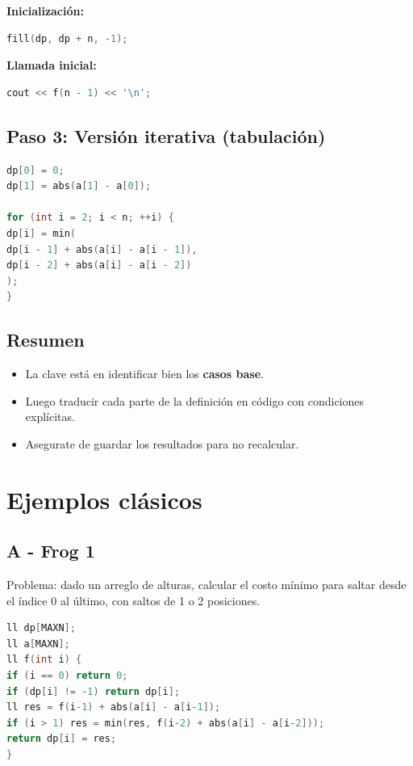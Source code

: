 \textbf{Inicialización:}

\begin{lstlisting}[language=C++]
fill(dp, dp + n, -1);
\end{lstlisting}

\textbf{Llamada inicial:}

\begin{lstlisting}[language=C++]
cout << f(n - 1) << '\n';
\end{lstlisting}

\subsection*{Paso 3: Versión iterativa (tabulación)}

\begin{lstlisting}[language=C++, caption=Versión iterativa (bottom-up)]
dp[0] = 0;
dp[1] = abs(a[1] - a[0]);

for (int i = 2; i < n; ++i) {
dp[i] = min(
dp[i - 1] + abs(a[i] - a[i - 1]),
dp[i - 2] + abs(a[i] - a[i - 2])
);
}
\end{lstlisting}

\subsection*{Resumen}

\begin{itemize}
\item La clave está en identificar bien los \textbf{casos base}.
\item Luego traducir cada parte de la definición en código con condiciones explícitas.
\item Asegurate de guardar los resultados para no recalcular.
\end{itemize}


\section{Ejemplos clásicos}

\subsection{A - Frog 1}

Problema: dado un arreglo de alturas, calcular el costo mínimo para saltar desde el índice 0 al último, con saltos de 1 o 2 posiciones.

\begin{lstlisting}[language=C++, caption=Frog1: DP mínima energía]
ll dp[MAXN];
ll a[MAXN];
ll f(int i) {
if (i == 0) return 0;
if (dp[i] != -1) return dp[i];
ll res = f(i-1) + abs(a[i] - a[i-1]);
if (i > 1) res = min(res, f(i-2) + abs(a[i] - a[i-2]));
return dp[i] = res;
}
\end{lstlisting}

